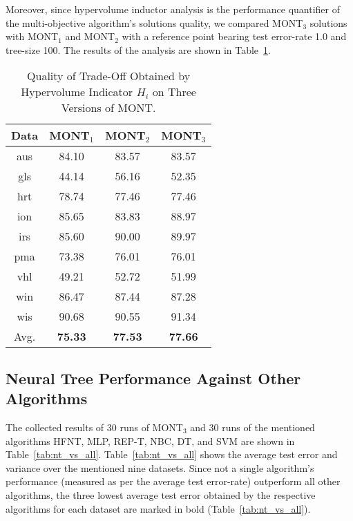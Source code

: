 \documentclass[conference]{IEEEtran}
\begin{document}
Moreover, since hypervolume inductor analysis is the performance quantifier of the multi-objective algorithm's solutions quality, we compared MONT$_3$ solutions with MONT$_1$ and MONT$_2$ with a reference point bearing test error-rate 1.0 and tree-size 100. The results of the analysis are shown in Table~\ref{tab:hv_res}.
\begin{table}
    \begin{center}
        \renewcommand{\arraystretch}{1}
        \setlength{\tabcolsep}{10pt}
        {\caption{Quality of Trade-Off Obtained by Hypervolume Indicator $ H_i$ on Three Versions of MONT. }\label{tab:hv_res}}        
        \begin{tabular}{cccc}
            \hline
            Data & MONT$_1$ & MONT$_2$ & MONT$_3$\\
            \hline
            aus & 84.10 & 83.57 & 83.57\\
            gls & 44.14 & 56.16 & 52.35\\
            hrt & 78.74 & 77.46 & 77.46\\
            ion & 85.65 & 83.83 & 88.97\\
            irs & 85.60 & 90.00 & 89.97\\
            pma & 73.38 & 76.01 & 76.01\\
            vhl & 49.21 & 52.72 & 51.99\\
            win & 86.47 & 87.44 & 87.28\\
            wis & 90.68 & 90.55 & 91.34\\
            \hline
            Avg. & \textbf{75.33} & \textbf{77.53} & \textbf{77.66}\\
            \hline
        \end{tabular}
    \end{center}
\end{table}

\subsection{Neural Tree Performance Against Other Algorithms}
\label{sec:res_nt_vs_all}
The collected results of 30 runs of MONT$_3$ and 30 runs of the mentioned algorithms HFNT, MLP, REP-T, NBC, DT, and SVM are shown in Table~\ref{tab:nt_vs_all}. Table~\ref{tab:nt_vs_all} shows the average test error and variance over the mentioned nine datasets. Since not a single algorithm's performance (measured as per the average test error-rate) outperform all other algorithms, the three lowest average test error obtained by the respective algorithms for each dataset are marked in bold (Table~\ref{tab:nt_vs_all}). 
\end{document}
